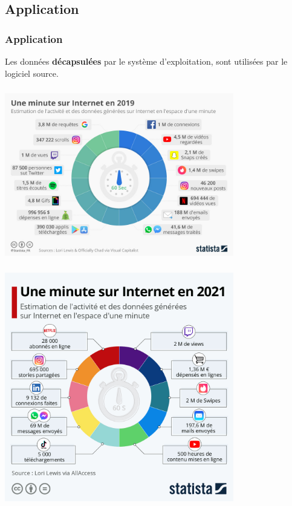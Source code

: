 \documentclass[svgnames,11pt]{beamer}
\begin{document}
\subsection{Application}
\begin{frame}
    \frametitle{Application}

    \begin{aretenir}[]
    Les données \textbf{décapsulées} par le système d'exploitation, sont utilisées par le logiciel source.
    \end{aretenir}

\end{frame}
\begin{frame}
    \frametitle{}

    \begin{center}
    \centering
    \includegraphics[width=10cm]{ressources/une-minute.jpeg}
    \end{center}

\end{frame}
\begin{frame}
    \frametitle{}

    \begin{center}
    \centering
    \includegraphics[width=10cm]{ressources/uneminute2021.jpeg}
    \end{center}
    
\end{frame}
\end{document}
